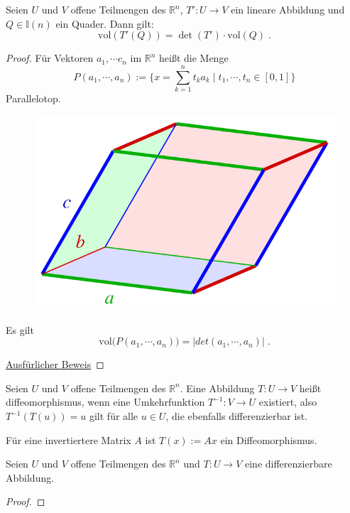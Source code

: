 \begin{Satz}
Seien $U$ und $V$ offene Teilmengen des $\mathbb{R}^n$, $T': U \to V$ ein lineare Abbildung und  $Q \in \mathbb{I}(n)$ ein Quader.
Dann gilt:
 $$ \text{vol}  (T'(Q))   =  \det (T') \cdot   \text{vol}(Q) \; .$$
\end{Satz}
\begin{proof}
Für Vektoren $a_1, \cdots c_n$ im $\mathbb{R}^n$ heißt die Menge 
$$ P(a_1, \cdots,  a_n) := \biggl \{  x = \sum_{k=1}^n t_k a_k  \; | \; t_1, \cdots , t_n \in [0,1]  \biggr \}$$
Parallelotop.
\begin{figure}[H]
      \centering
    \includegraphics[width=0.6 \textwidth]{images/640px-Parallelepiped-0}    
\end{figure}
Es gilt  $$  \text{vol} \bigr( P(a_1, \cdots, a_n) \bigr) =  | det (a_1, \cdots, a_n) |   \; .$$

\href{https://www.math.uchicago.edu/~may/VIGRE/VIGRE2007/REUPapers/FINALAPP/Peng.pdf}{Ausfürlicher Beweis}

\end{proof}


\begin{Definition}[Diffeomorphismus]
Seien $U$ und $V$ offene Teilmengen des $\mathbb{R}^n$. Eine Abbildung  $T: U \to V$ heißt diffeomorphismus, wenn eine  Umkehrfunktion $T^{-1}: V  \to U$ existiert, also $T^{-1} (T (u)) = u$ gilt für alle $u \in U$, die ebenfalls differenzierbar ist.
\end{Definition}

\begin{Beispiel}
Für eine invertiertere Matrix $A$ ist $T(x):= Ax$ ein Diffeomorphismus.
\end{Beispiel}

\begin{Satz}
Seien $U$ und $V$ offene Teilmengen des $\mathbb{R}^n$ und $T: U \to V$ eine differenzierbare Abbildung.
\end{Satz}
\begin{proof}

\end{proof}

